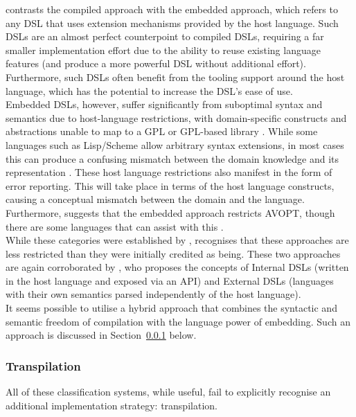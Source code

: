 \citet{Mernik:2005:DDL:1118890.1118892} contrasts the compiled approach with the embedded approach, which refers to any DSL that uses extension mechanisms provided by the host language. 
Such DSLs are an almost perfect counterpoint to compiled DSLs, requiring a far smaller implementation effort due to the ability to reuse existing language features (and produce a more powerful DSL without additional effort). 
Furthermore, such DSLs often benefit from the tooling support around the host language, which has the potential to increase the DSL's ease of use. \\

Embedded DSLs, however, suffer significantly from suboptimal syntax and semantics due to host-language restrictions, with domain-specific constructs and abstractions unable to map to a GPL or GPL-based library \citep{Mernik:2005:DDL:1118890.1118892,van2000domain}. 
While some languages such as Lisp/Scheme allow arbitrary syntax extensions, in most cases this can produce a confusing mismatch between the domain knowledge and its representation \citep{jennings1999verischemelog}. 
These host language restrictions also manifest in the form of error reporting. 
This will take place in terms of the host language constructs, causing a conceptual mismatch between the domain and the language. 
Furthermore, \citet{Mernik:2005:DDL:1118890.1118892} suggests that the embedded approach restricts AVOPT, though there are some languages that can assist with this \citep{seefried2004optimising}.\\

While these categories were established by \citet{van2000domain}, \citet{Mernik:2005:DDL:1118890.1118892} recognises that these approaches are less restricted than they were initially credited as being. 
These two approaches are again corroborated by \citet{fowler2010domain}, who proposes the concepts of Internal DSLs (written in the host language and exposed via an API) and External DSLs (languages with their own semantics parsed independently of the host language). \\

It seems possible to utilise a hybrid approach that combines the syntactic and semantic freedom of compilation with the language power of embedding. 
Such an approach is discussed in Section~\ref{ssub:transpilation} below. 


\subsubsection{Transpilation} %
\label{ssub:transpilation}
All of these classification systems, while useful, fail to explicitly recognise an additional implementation strategy: transpilation. \\

